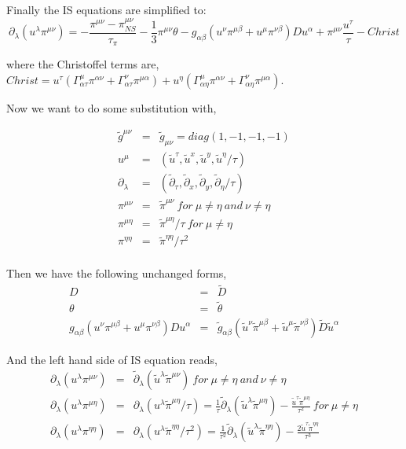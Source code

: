 \documentclass[11pt, oneside]{article}   	%
\begin{document}
Finally the IS equations are simplified to:
\begin{equation}
\partial_{\lambda}(u^{\lambda}\pi^{\mu\nu}) =  - \frac{\pi^{\mu\nu} - \pi_{NS}^{\mu\nu}}{\tau_{\pi}} - \frac{1}{3}\pi^{\mu\nu}\theta - g_{\alpha\beta}(u^{\nu}\pi^{\mu\beta} + u^{\mu} \pi^{\nu\beta})Du^{\alpha}  + \pi^{\mu\nu}\frac{u^{\tau}}{\tau} - Christ
\end{equation}

where the Christoffel terms are,
$Christ = u^{\tau}\left(\Gamma^{\mu}_{\alpha\tau}\pi^{\alpha\nu} + \Gamma^{\nu}_{\alpha\tau}\pi^{\mu\alpha}\right) + u^{\eta}\left(\Gamma^{\mu}_{\alpha\eta}\pi^{\alpha\nu} + \Gamma^{\nu}_{\alpha\eta}\pi^{\mu\alpha}\right) $.

Now we want to do some substitution with,

\begin{eqnarray}
    \tilde{g}^{\mu\nu} &=& \tilde{g}_{\mu\nu} = diag(1, -1, -1, -1) \\
    u^{\mu} &=& (\tilde{u}^{\tau}, \tilde{u}^{x}, \tilde{u}^{y}, \tilde{u}^{\eta}/\tau) \\
    \partial_{\lambda} &=& (\tilde{\partial}_{\tau}, \tilde{\partial}_{x}, \tilde{\partial}_{y}, \tilde{\partial}_{\eta}/\tau) \\
    \pi^{\mu\nu} &=& \tilde{\pi}^{\mu\nu}  \   for\ \mu \neq \eta \ and \ \nu \neq \eta  \\
    \pi^{\mu\eta} &=& \tilde{\pi}^{\mu\eta}/\tau  \   for\ \mu \neq \eta \\
    \pi^{\eta\eta} &=& \tilde{\pi}^{\eta\eta}/\tau^2 \\
\end{eqnarray}

Then we have the following unchanged forms,
\begin{eqnarray}
    D &=& \tilde{D} \\
    \theta &=& \tilde{\theta} \\
    g_{\alpha\beta}(u^{\nu}\pi^{\mu\beta} + u^{\mu} \pi^{\nu\beta})Du^{\alpha} &=& \tilde{g}_{\alpha\beta}(\tilde{u}^{\nu}\tilde{\pi}^{\mu\beta} + \tilde{u}^{\mu} \tilde{\pi}^{\nu\beta})\tilde{D}\tilde{u}^{\alpha}
\end{eqnarray}

And the left hand side of IS equation reads,
\begin{eqnarray}
\partial_{\lambda}(u^{\lambda}\pi^{\mu\nu}) &=& \tilde{\partial}_{\lambda}(\tilde{u}^{\lambda}\tilde{\pi}^{\mu\nu})  \ for \ \mu \neq \eta \ and \ \nu \neq \eta \\
\partial_{\lambda}(u^{\lambda}\pi^{\mu\eta}) &=& \partial_{\lambda}(u^{\lambda}\tilde{\pi}^{\mu\eta}/\tau) = \frac{1}{\tau}\tilde{\partial}_{\lambda}(\tilde{u}^{\lambda}\tilde{\pi}^{\mu\eta}) - \frac{\tilde{u}^{\tau}\tilde{\pi}^{\mu\eta}}{\tau^2}  \ for \ \mu \neq \eta \\
\partial_{\lambda}(u^{\lambda}\pi^{\eta\eta}) &=& \partial_{\lambda}(u^{\lambda}\tilde{\pi}^{\eta\eta}/\tau^2) = \frac{1}{\tau^2}\tilde{\partial}_{\lambda}(\tilde{u}^{\lambda}\tilde{\pi}^{\eta\eta}) - \frac{2\tilde{u}^{\tau}\tilde{\pi}^{\eta\eta}}{\tau^3} \\
\end{eqnarray}
\end{document}
